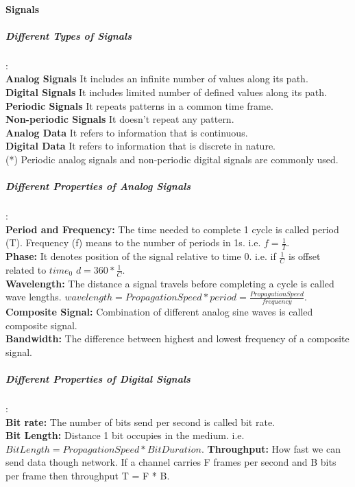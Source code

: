 \paragraph{Signals}
\subparagraph{Different Types of Signals}:\\
\indent \textbf{Analog Signals} It includes an infinite number of values along its path.\\
\indent \textbf{Digital Signals} It includes limited number of defined values along its path.\\
\indent \textbf{Periodic Signals} It repeats patterns in a common time frame.\\
\indent \textbf{Non-periodic Signals} It doesn't repeat any pattern.\\
\indent \textbf{Analog Data} It refers to information that is continuous.\\
\indent \textbf{Digital Data} It refers to information that is discrete in nature.\\
(*) Periodic analog signals and non-periodic digital signals are commonly used.
\subparagraph{Different Properties of Analog Signals}:\\
\indent \textbf{Period and Frequency:} The time needed to complete 1 cycle is called period (T). Frequency (f) means to the number of periods in 1s. i.e. $ f=\frac{1}{T} $.\\
\indent \textbf{Phase:} It denotes position of the signal relative to time 0. i.e. if $\frac{1}{C} $ is offset related to $time_0$ $d=360*\frac{1}{C}$.\\
\indent \textbf{Wavelength:} The distance a signal travels before completing a cycle is called wave lengths. $wavelength = PropagationSpeed * period = \frac{PropagationSpeed}{frequency}$.\\
\indent \textbf{Composite Signal:} Combination of different analog sine waves is called composite signal.\\
\indent \textbf{Bandwidth:} The difference between highest and lowest frequency of a composite signal.\\
\subparagraph{Different Properties of Digital Signals}:\\
\indent \textbf{Bit rate:} The number of bits send per second is called bit rate.\\
\indent \textbf{Bit Length:} Distance 1 bit occupies in the medium. i.e. $BitLength = PropagationSpeed * BitDuration$.
\indent \textbf{Throughput:} How fast we can send data though network. If a channel carries F frames per second and B bits per frame then throughput T = F * B.\\
